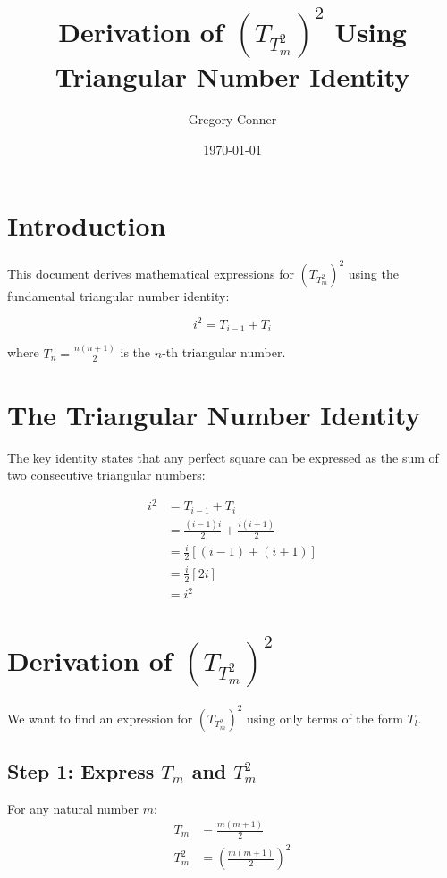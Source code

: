 \documentclass{article}
\title{Derivation of $(T_{T_m^2})^2$ Using Triangular Number Identity}
\author{Gregory Conner}
\date{\today}
\begin{document}
\maketitle

\section{Introduction}

This document derives mathematical expressions for $(T_{T_m^2})^2$ using the fundamental triangular number identity:

\begin{equation}
i^2 = T_{i-1} + T_i
\end{equation}

where $T_n = \frac{n(n+1)}{2}$ is the $n$-th triangular number.

\section{The Triangular Number Identity}

The key identity states that any perfect square can be expressed as the sum of two consecutive triangular numbers:

\begin{align}
i^2 &= T_{i-1} + T_i \\
&= \frac{(i-1)i}{2} + \frac{i(i+1)}{2} \\
&= \frac{i}{2}[(i-1) + (i+1)] \\
&= \frac{i}{2}[2i] \\
&= i^2
\end{align}

\section{Derivation of $(T_{T_m^2})^2$}

We want to find an expression for $(T_{T_m^2})^2$ using only terms of the form $T_l$.

\subsection{Step 1: Express $T_m$ and $T_m^2$}

For any natural number $m$:
\begin{align}
T_m &= \frac{m(m+1)}{2} \\
T_m^2 &= \left(\frac{m(m+1)}{2}\right)^2
\end{align}
\end{document}
